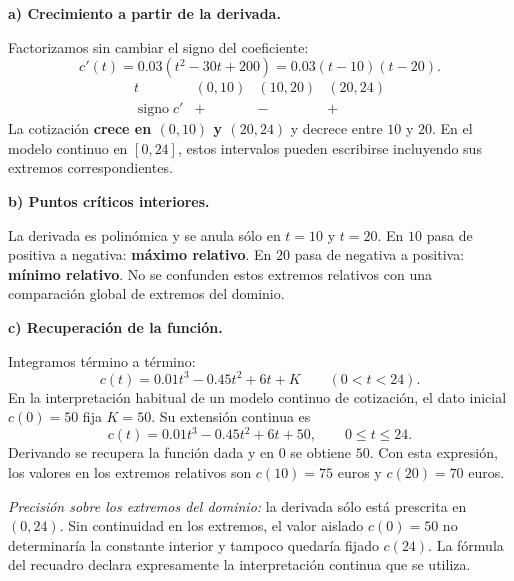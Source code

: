 \textbf{a) Crecimiento a partir de la derivada.}\par\nopagebreak[4]
Factorizamos sin cambiar el signo del coeficiente:
\[
c'(t)=0.03(t^2-30t+200)=0.03(t-10)(t-20).
\]
\[
\begin{array}{c|ccc}
t&(0,10)&(10,20)&(20,24)\\\hline
\operatorname{signo}c'&+&-&+
\end{array}
\]
La cotización \textbf{crece en $(0,10)$ y $(20,24)$} y decrece entre $10$ y $20$. En el modelo continuo en $[0,24]$, estos intervalos pueden escribirse incluyendo sus extremos correspondientes.

\textbf{b) Puntos críticos interiores.}\par\nopagebreak[4]
La derivada es polinómica y se anula sólo en $t=10$ y $t=20$. En $10$ pasa de positiva a negativa: \textbf{máximo relativo}. En $20$ pasa de negativa a positiva: \textbf{mínimo relativo}. No se confunden estos extremos relativos con una comparación global de extremos del dominio.

\textbf{c) Recuperación de la función.}\par\nopagebreak[4]
Integramos término a término:
\[
c(t)=0.01t^3-0.45t^2+6t+K\qquad(0<t<24).
\]
En la interpretación habitual de un modelo continuo de cotización, el dato inicial $c(0)=50$ fija $K=50$. Su extensión continua es
\[
\boxed{c(t)=0.01t^3-0.45t^2+6t+50,\qquad0\leq t\leq24.}
\]
Derivando se recupera la función dada y en $0$ se obtiene $50$. Con esta expresión, los valores en los extremos relativos son $c(10)=75$ euros y $c(20)=70$ euros.

\emph{Precisión sobre los extremos del dominio:} la derivada sólo está prescrita en $(0,24)$. Sin continuidad en los extremos, el valor aislado $c(0)=50$ no determinaría la constante interior y tampoco quedaría fijado $c(24)$. La fórmula del recuadro declara expresamente la interpretación continua que se utiliza.

